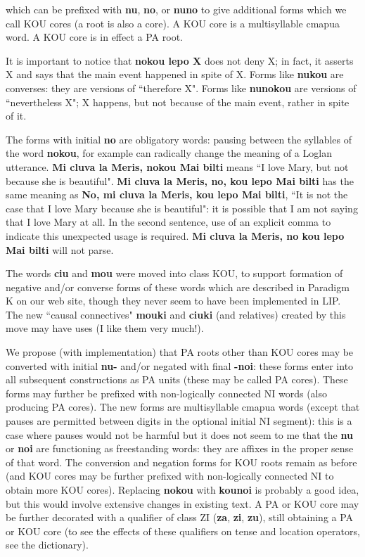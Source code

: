 \documentclass[12pt]{book}
\begin{document}
 which can be prefixed with {\bf nu}, {\bf no}, or {\bf nuno} to give additional forms which we call KOU cores (a root is also a core).   A KOU core is a multisyllable cmapua word.  A KOU core is in effect a PA root.


It is important to notice that {\bf nokou lepo X} does not deny X; in fact, it asserts X and says that the main event happened in spite of X.   Forms like {\bf nukou} are converses:  they are versions of ``therefore X".  Forms like {\bf nunokou} are versions of ``nevertheless X"; X happens, but not because of the main event, rather in spite of it.

The forms with initial {\bf no} are obligatory words:  pausing between the syllables of the word {\bf nokou}, for example can radically change the meaning of a Loglan utterance.
{\bf Mi cluva la Meris, nokou Mai bilti} means ``I love Mary, but not because she is beautiful".  {\bf Mi cluva la Meris, no, kou lepo Mai bilti} has the same meaning as {\bf No, mi cluva la Meris, kou lepo Mai bilti}, ``It is not the case that I love Mary because she is beautiful":  it is possible that I am not saying that I love Mary at all.  In the second sentence, use of an explicit comma to indicate this unexpected usage is required.  {\bf Mi cluva la Meris, no kou lepo Mai bilti}  will not parse.

The words {\bf ciu} and {\bf mou} were moved into class KOU, to support formation of negative and/or converse forms of these words which are described in Paradigm K on our web site, though they never seem to have been implemented in LIP.  The new ``causal connectives" {\bf mouki} and {\bf ciuki} (and relatives) created by this move may have uses (I like them very much!).

We propose (with implementation) that PA roots other than KOU cores may be converted with initial {\bf nu-} and/or negated with final {\bf -noi}:  these forms enter into all subsequent constructions as PA units (these may be called PA cores). These forms may further be prefixed with non-logically connected NI words (also producing PA cores).  The new forms are multisyllable cmapua words (except that pauses are permitted between digits in the optional initial NI segment):  this is a case where pauses would not be harmful but it does not seem to me that the {\bf nu} or {\bf noi} are functioning as freestanding words:  they are affixes in the proper sense of that word.  The conversion and negation forms for KOU roots remain as before (and KOU cores may be further prefixed with non-logically connected NI to obtain more KOU cores).   Replacing {\bf nokou} with {\bf kounoi} is probably a good idea, but this would involve extensive changes in existing text.  A PA or KOU core may be further decorated with a qualifier of class ZI ({\bf za}, {\bf zi}, {\bf zu}), still obtaining a PA or KOU core (to see the effects of these qualifiers on tense and location operators, see the dictionary). 
\end{document}
